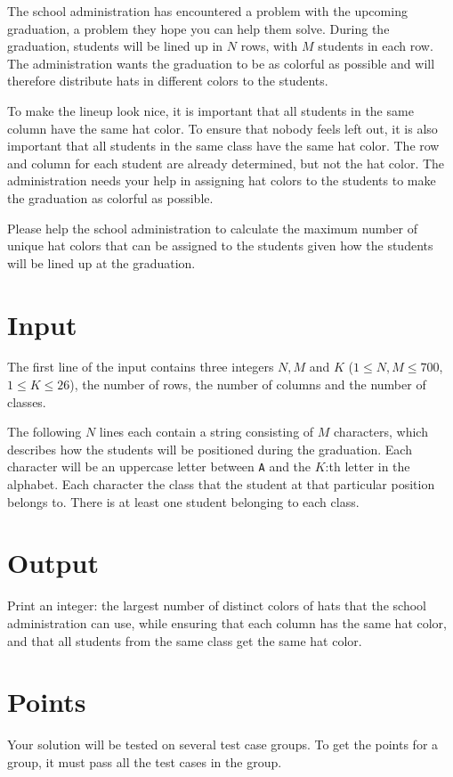 \noindent
The school administration has encountered a problem with the upcoming graduation, a problem they hope
you can help them solve. During the graduation, students will be lined up in $N$ rows, with $M$ students in each row.
The administration wants the graduation to be as colorful as possible and will therefore distribute hats in
different colors to the students.

To make the lineup look nice, it is important that all students in the same column have the same hat color.
To ensure that nobody feels left out, it is also important that all students in the same class have the same
hat color. The row and column for each student are already determined, but not the hat color. The administration
needs your help in assigning hat colors to the students to make the graduation as colorful as possible.

Please help the school administration to calculate the maximum number of unique hat colors that can be assigned to the students
given how the students will be lined up at the graduation.

\section*{Input}
The first line of the input contains three integers $N, M$ and $K$ ($1 \leq N,M \leq 700$, $1 \leq K \leq 26$),
the number of rows, the number of columns and the number of classes.

The following $N$ lines each contain a string consisting of $M$ characters, which describes how the students
will be positioned during the graduation. Each character will be an uppercase letter between \texttt{A} and the $K$:th
letter in the alphabet. Each character the class that the student at that particular position belongs to. There is at
least one student belonging to each class.

\section*{Output}
Print an integer: the largest number of distinct colors of hats that the school administration can use, while
ensuring that each column has the same hat color, and that all students from the same class get the same hat color.

\section*{Points}
Your solution will be tested on several test case groups.
To get the points for a group, it must pass all the test cases in the group.

